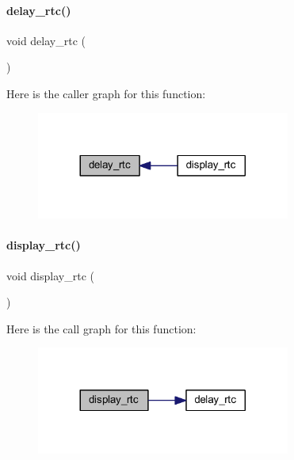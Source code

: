 \paragraph{delay\+\_\+rtc()}
{\footnotesize\ttfamily void delay\+\_\+rtc (\begin{DoxyParamCaption}{ }\end{DoxyParamCaption})}

Here is the caller graph for this function\+:
\nopagebreak
\begin{figure}[H]
\begin{center}
\leavevmode
\includegraphics[width=236pt]{a00041_a30a11d605a2fcfe8fc79c4f0a17a20cf_icgraph}
\end{center}
\end{figure}
\mbox{\label{a00041_a304536cc402df7d7fc7328f36f746f16}} 
\paragraph{display\+\_\+rtc()}
{\footnotesize\ttfamily void display\+\_\+rtc (\begin{DoxyParamCaption}{ }\end{DoxyParamCaption})}

Here is the call graph for this function\+:
\nopagebreak
\begin{figure}[H]
\begin{center}
\leavevmode
\includegraphics[width=236pt]{a00041_a304536cc402df7d7fc7328f36f746f16_cgraph}
\end{center}
\end{figure}
\mbox{\label{a00041_a0665eb059e742e4bb5a419144336e147}} 
